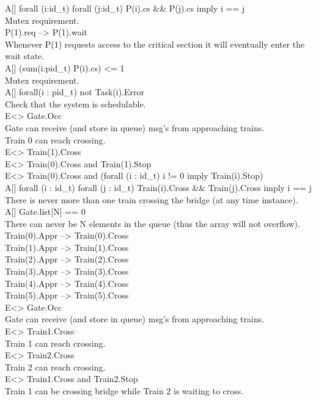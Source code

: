A[] forall (i:id_t) forall (j:id_t) P(i).cs && P(j).cs imply i == j \\
Mutex requirement. \\
P(1).req --> P(1).wait \\
Whenever P(1) requests access to the critical section it will eventually enter the wait state. \\
A[] (sum(i:pid_t) P(i).cs) <= 1 \\
Mutex requirement. \\
A[] forall(i : pid_t) not Task(i).Error \\
Check that the system is schedulable. \\
E<> Gate.Occ \\
Gate can receive (and store in queue) msg's from approaching trains. \\
Train 0 can reach crossing. \\
E<> Train(1).Cross \\
E<> Train(0).Cross and Train(1).Stop \\
E<> Train(0).Cross and (forall (i : id_t) i != 0 imply Train(i).Stop) \\
A[] forall (i : id_t) forall (j : id_t) Train(i).Cross && Train(j).Cross imply i == j
There is never more than one train crossing the bridge (at any time instance). \\
A[] Gate.list[N] == 0 \\
There can never be N elements in the queue (thus the array will not overflow). \\
Train(0).Appr --> Train(0).Cross \\
Train(1).Appr --> Train(1).Cross \\
Train(2).Appr --> Train(2).Cross \\
Train(3).Appr --> Train(3).Cross \\
Train(4).Appr --> Train(4).Cross \\
Train(5).Appr --> Train(5).Cross \\
E<> Gate.Occ \\
Gate can receive (and store in queue) msg's from approaching trains. \\
E<> Train1.Cross \\
Train 1 can reach crossing. \\
E<> Train2.Cross \\
Train 2 can reach crossing. \\
E<> Train1.Cross and Train2.Stop \\
Train 1 can be crossing bridge while Train 2 is waiting to cross. \\
